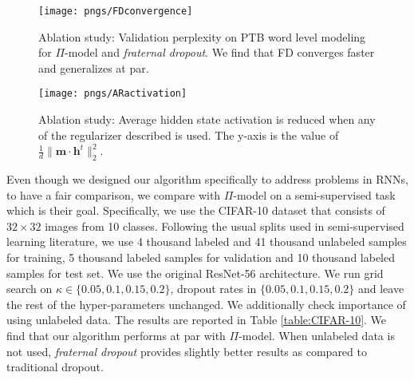 \documentclass{article} %
\begin{document}
\begin{figure}[t]
\vspace{-0.08cm}
  \centering
  \begin{minipage}[b]{0.48\textwidth}
    \texttt{[image: pngs/FDconvergence]}
    \caption{Ablation study: Validation perplexity on PTB word level modeling for $\Pi$-model and \emph{fraternal dropout}. We find that FD converges faster and generalizes at par.}
    \label{FDconvergence}
  \end{minipage}
  \hfill
  \begin{minipage}[b]{0.48\textwidth}
    \texttt{[image: pngs/ARactivation]}
    \caption{Ablation study: Average hidden state activation is reduced when any of the regularizer described is used. The y-axis is the value of $\frac{1}{d}\lVert\mathbf{m \cdot h}^t\rVert_2^2$.}
    \label{ARactivation}
  \end{minipage}
\vspace{-0.08cm}
\end{figure}

Even though we designed our algorithm specifically to address problems in RNNs, to have a fair comparison, we compare with $\Pi$-model on a semi-supervised task which is their goal. Specifically, we use the CIFAR-10 dataset that consists of $32 \times 32$ images from 10 classes. Following the usual splits used in semi-supervised learning literature, we use 4 thousand labeled and 41 thousand unlabeled samples for training, 5 thousand labeled samples for validation and 10 thousand labeled samples for test set. We use the original ResNet-56 \citep{DBLP:journals/corr/HeZRS15} architecture. We run grid search on $\kappa \in \{0.05, 0.1, 0.15, 0.2\}$, dropout rates in $\{0.05, 0.1, 0.15, 0.2\}$ and leave the rest of the hyper-parameters unchanged. We additionally check importance of using unlabeled data. The results are reported in Table \ref{table:CIFAR-10}. We find that our algorithm performs at par with $\Pi$-model. When unlabeled data is not used, \emph{fraternal dropout} provides slightly better results as compared to traditional dropout.
\end{document}
